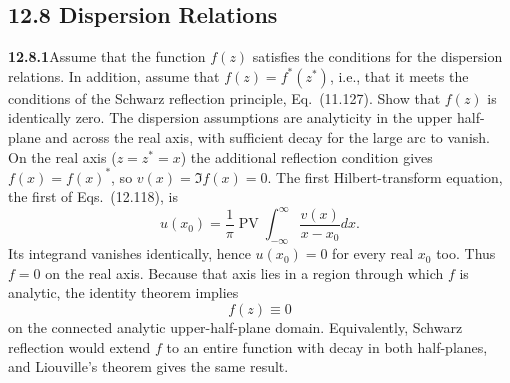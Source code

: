\subsection*{12.8 Dispersion Relations}

\par\bigskip
\noindent\textbf{12.8.1}\quad Assume that the function $f(z)$ satisfies the
conditions for the dispersion relations. In addition, assume that
$f(z)=f^{*}(z^{*})$, i.e., that it meets the conditions of the Schwarz
reflection principle, Eq.~(11.127). Show that $f(z)$ is identically zero.
\solution
The dispersion assumptions are analyticity in the upper half-plane and
across the real axis, with sufficient decay for the large arc to vanish.
On the real axis ($z=z^*=x$) the additional reflection condition gives
$f(x)=f(x)^*$, so $v(x)=\Im f(x)=0$.
The first Hilbert-transform equation, the first of Eqs.~(12.118), is
\[
u(x_0)=\frac1\pi\operatorname{PV}\int_{-\infty}^{\infty}
\frac{v(x)}{x-x_0}dx.
\]
Its integrand vanishes identically, hence $u(x_0)=0$ for every real
$x_0$ too. Thus $f=0$ on the real axis. Because that axis lies in a
region through which $f$ is analytic, the identity theorem implies
\[
\boxed{f(z)\equiv0}
\]
on the connected analytic upper-half-plane domain. Equivalently,
Schwarz reflection would extend $f$ to an entire function with decay
in both half-planes, and Liouville's theorem gives the same result.

